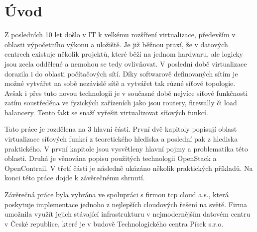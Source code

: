 
\chapter{Úvod}

Z posledních 10 let došlo v IT k velkému rozšíření virtualizace, především v oblasti výpočetního výkonu a uložiště. Je již běžnou praxí, že v datových centrech existuje několik projektů, které běží na jednom hardwaru, ale logicky jsou zcela oddělené a nemohou se tedy ovlivňovat. V poslední době virtualizace dorazila i do oblasti počítačových sítí. Díky softwarově definovaných sítím je možné vytvářet na sobě nezávislé sítě a vytvářet tak různé síťové topologie.  Avšak i přes tuto novou technologii je v současné době nejvíce síťové funkčnosti zatím soustředěna ve fyzických zařízeních jako jsou routery, firewally či load balancery. Tento fakt se snaží vyřešit virtualizovat síťových funkcí.

Tato práce je rozdělena na 3 hlavní části. První dvě kapitoly popisují oblast virtualizace síťových funkcí z teoretického hlediska a poslední pak z hlediska praktického. V první kapitole jsou vysvětleny hlavní pojmy a problematika této oblasti. Druhá je věnována popisu použitých technologii OpenStack a OpenContrail. V třetí části je následně ukázáno několik praktických příkladů. Na konci této práce dojde k závěrečnému shrnutí.

Závěrečná práce byla vybrána ve spolupráci s firmou tcp cloud a.s., která poskytuje implementace jednoho z nejlepších cloudových řešení na světě. Firma umožnila využít jejich stávající infrastrukturu v nejmodernějším datovém centru v České republice, které je v budově Technologického centra Písek s.r.o.



